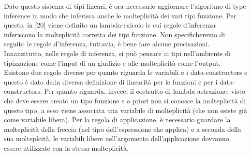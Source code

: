 \documentclass[10pt,a4paper]{article}
\begin{document}
Dato questo sistema di tipi lineari, è ora necessario aggiornare l'algoritmo di type inference in modo che inferisca
anche le molteplicità dei vari tipi funzione. Per questo, in [20] viene definito un lambda-calcolo le cui regole
d'inferenza inferiscono la molteplicità corretta dei tipi funzione. Non specificheremo di seguito le regole d'inferenza,
tuttavia, è bene fare alcune precisazioni. Innanzitutto, nelle regole di inferenza, si può pensare ai tipi nell'ambiente
di tipizzazione come l'input di un giudizio e alle molteplicità come l'output.
Esistono due regole diverse per quanto riguarda le variabili e i data-constructors e questo è dato dalla diversa
definizione di linearità per le funzioni e per i data-constructors. Per quanto riguarda, invece, il costrutto di
lambda-astrazione, visto che deve essere creato un tipo funzione e a priori non si conosce la molteplicità di questo
tipo, a esso viene associata una variabile di molteplicità (che non esiste già come variabile libera). Per la regola
di applicazione, è necessario guardare la
molteplicità della freccia (nel tipo dell'espressione che applica) e a seconda della sua molteplcità, le variabili libere
nell'argomento dell'applicazione dovranno essere utilizzate con la stessa molteplicità.
\end{document}
